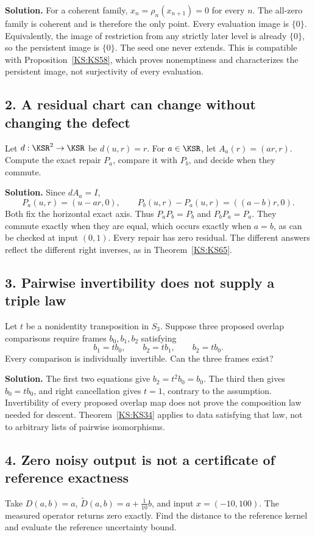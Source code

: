 \documentclass[11pt,oneside,openany]{book}
\numberwithin{equation}{section}
\begin{document}
\textbf{Solution.} For a coherent family, \(x_n=\rho_n(x_{n+1})=0\) for every \(n\). The all-zero family is coherent and is therefore the only point. Every evaluation image is \(\{0\}\). Equivalently, the image of restriction from any strictly later level is already \(\{0\}\), so the persistent image is \(\{0\}\). The seed one never extends. This is compatible with Proposition~\ref{KS:KS58}, which proves nonemptiness and characterizes the persistent image, not surjectivity of every evaluation.

\subsection*{2. A residual chart can change without changing the defect}
Let \(d:\KSR^2\to\KSR\) be \(d(u,r)=r\). For \(a\in\KSR\), let \(A_a(r)=(ar,r)\). Compute the exact repair \(P_a\), compare it with \(P_b\), and decide when they commute.

\textbf{Solution.} Since \(dA_a=I\),
\[
 P_a(u,r)=(u-ar,0),\qquad
 P_b(u,r)-P_a(u,r)=((a-b)r,0).
\]
Both fix the horizontal exact axis. Thus \(P_aP_b=P_b\) and \(P_bP_a=P_a\). They commute exactly when they are equal, which occurs exactly when \(a=b\), as can be checked at input \((0,1)\). Every repair has zero residual. The different answers reflect the different right inverses, as in Theorem~\ref{KS:KS65}.

\subsection*{3. Pairwise invertibility does not supply a triple law}
Let \(t\) be a nonidentity transposition in \(S_3\). Suppose three proposed overlap comparisons require frames \(b_0,b_1,b_2\) satisfying
\[
 b_1=tb_0,\qquad b_2=tb_1,\qquad b_2=tb_0.
\]
Every comparison is individually invertible. Can the three frames exist?

\textbf{Solution.} The first two equations give \(b_2=t^2b_0=b_0\). The third then gives \(b_0=tb_0\), and right cancellation gives \(t=1\), contrary to the assumption. Invertibility of every proposed overlap map does not prove the composition law needed for descent. Theorem~\ref{KS:KS34} applies to data satisfying that law, not to arbitrary lists of pairwise isomorphisms.

\subsection*{4. Zero noisy output is not a certificate of reference exactness}
Take \(D(a,b)=a\), \(\widetilde D(a,b)=a+\tfrac1{10}b\), and input \(x=(-10,100)\). The measured operator returns zero exactly. Find the distance to the reference kernel and evaluate the reference uncertainty bound.
\end{document}
